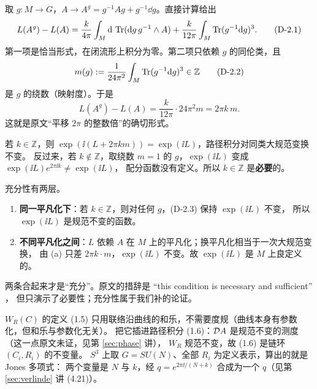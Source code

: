 \begin{derivation}[D-2.2：大规范变换与绕数]
取 $g:M\to G$，$A\to A^g=g^{-1}Ag+g^{-1}\dd g$。直接计算给出
\begin{equation}
L(A^g)-L(A)=\frac{k}{4\pi}\int_M\mathrm{d}\,\operatorname{Tr}(\mathrm{d} g\,g^{-1}\wedge A)
+\frac{k}{12\pi}\int_M\operatorname{Tr}(g^{-1}\mathrm{d} g)^3. \tag{D-2.1}
\end{equation}
第一项是恰当形式，在闭流形上积分为零。第二项只依赖 $g$ 的同伦类，且
\begin{equation}
m(g):=\frac{1}{24\pi^2}\int_M\operatorname{Tr}(g^{-1}\mathrm{d} g)^3\in\mathbb Z \tag{D-2.2}
\end{equation}
是 $g$ 的绕数（映射度）。于是
\begin{equation}
L(A^g)-L(A)=\frac{k}{12\pi}\cdot 24\pi^2m=2\pi k\,m. \tag{D-2.3}
\end{equation}
这就是原文“平移 $2\pi$ 的整数倍”的确切形式。\ours
\end{derivation}

\begin{derivation}[D-2.3：必要性]
若 $k\in\mathbb Z$，则 $\exp(\ii(L+2\pi km))=\exp(\ii L)$，路径积分对同类大规范变换不变。
反过来，若 $k\notin\mathbb Z$，取绕数 $m=1$ 的 $g$，$\exp(\ii L)$ 变成 $\exp(\ii L)e^{2\pi\ii k}\ne\exp(\ii L)$，
配分函数没有定义。所以 $k\in\mathbb Z$ 是\textbf{必要}的。
\end{derivation}

\begin{derivation}
充分性有两层。
\begin{enumerate}[label=(\alph*),leftmargin=*]
  \item \textbf{同一平凡化下}：若 $k\in\mathbb Z$，则对任何 $g$，(D-2.3) 保持 $\exp(\ii L)$ 不变，
        所以 $\exp(\ii L)$ 是规范不变的函数。
  \item \textbf{不同平凡化之间}：$L$ 依赖 $A$ 在 $M$ 上的平凡化；换平凡化相当于一次大规范变换，
        由 (a) 只差 $2\pi k\cdot m$，$\exp(\ii L)$ 不变。故 $\exp(\ii L)$ 是 $M$ 上良定义的。
\end{enumerate}
两条合起来才是“充分”。原文的措辞是 “this condition is necessary and sufficient” ，
但只演示了必要性；充分性属于我们补的论证。\ours
\end{derivation}

\begin{derivation}[D-2.5：Wilson 线与 (1.6)]
$W_R(C)$ 的定义 (1.5) 只用联络沿曲线的和乐，不需要度规（曲线本身有参数化，但和乐与参数化无关）。
把它插进路径积分 (1.6)：$\mathcal{D} A$ 是规范不变的测度（这一点原文未证，见第 \ref{sec:phase} 讲），
$W_R$ 规范不变，故 (1.6) 是链环 $(C_i,R_i)$ 的不变量。
$S^3$ 上取 $G=SU(N)$、全部 $R_i$ 为定义表示，算出的就是 Jones 多项式：
两个变量是 $N$ 与 $k$，经 $q=e^{2\pi\ii/(N+k)}$ 合成为一个 $q$（见第 \ref{sec:verlinde} 讲 (4.21)）。
\end{derivation}

